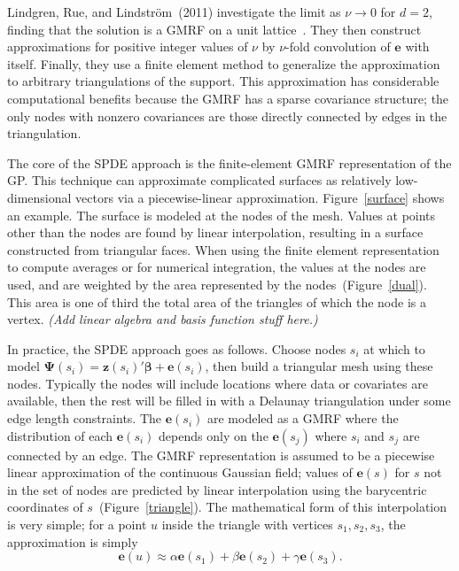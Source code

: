 \documentclass[]{interact}
\begin{document}
Lindgren, Rue, and Lindstr\"{o}m~(2011) investigate the limit as \(\nu \to 0\) for
\(d = 2\), finding that the solution is a GMRF on a unit
lattice~\cite{lindgrenetal}. They then construct approximations for positive
integer values of \(\nu\) by \(\nu\)-fold convolution of \(\mathbf{e}\)
with itself. Finally, they use a finite element method to generalize the
approximation to arbitrary triangulations of the support. This approximation
has considerable computational benefits because the GMRF has a sparse
covariance structure; the only nodes with nonzero covariances are those
directly connected by edges in the triangulation.

The core of the SPDE approach is the finite-element GMRF representation of the
GP. This technique can approximate complicated surfaces as relatively
low-dimensional vectors via a piecewise-linear approximation.
Figure~\ref{surface} shows an example. The surface is modeled at the nodes of
the mesh. Values at points other than the nodes are found by linear
interpolation, resulting in a surface constructed from triangular faces. When
using the finite element representation to compute averages or for numerical
integration, the values at the nodes are used, and are weighted by the area
represented by the nodes~(Figure~\ref{dual}). This area is one of third the
total area of the triangles of which the node is a vertex.
{\it (Add linear algebra and basis function stuff here.)}

In practice, the SPDE approach goes as follows. Choose nodes \(s_{i}\)
at which to model \(\boldsymbol{\Psi}(s_{i})
= \mathbf{z}(s_{i})' \boldsymbol{\beta} + \mathbf{e}(s_{i})\), then build a
triangular mesh using these nodes. Typically the nodes will include locations
where data or covariates are available, then the rest will be filled in with a
Delaunay triangulation under some edge length constraints. The
\(\mathbf{e}(s_{i})\) are modeled as a GMRF where the distribution of
each \(\mathbf{e}(s_{i})\) depends only on the
\(\mathbf{e}(s_{j})\) where \(s_{i}\) and \(s_{j}\) are connected by an
edge. The GMRF representation is assumed to be a piecewise linear approximation
of the continuous Gaussian field; values of \(\mathbf{e}(s)\) for
\(s\) not in the set of nodes are predicted by linear interpolation using
the barycentric coordinates of \(s\)~(Figure~\ref{triangle}). The mathematical
form of this interpolation is very simple; for a point \(u\) inside the
triangle with vertices \(s_{1}, s_{2}, s_{3}\), the approximation is simply
\begin{displaymath}
\mathbf{e}(u) \approx \alpha \mathbf{e}(s_{1})
+ \beta \mathbf{e}(s_{2}) + \gamma \mathbf{e}(s_{3}).
\end{displaymath}
\end{document}
